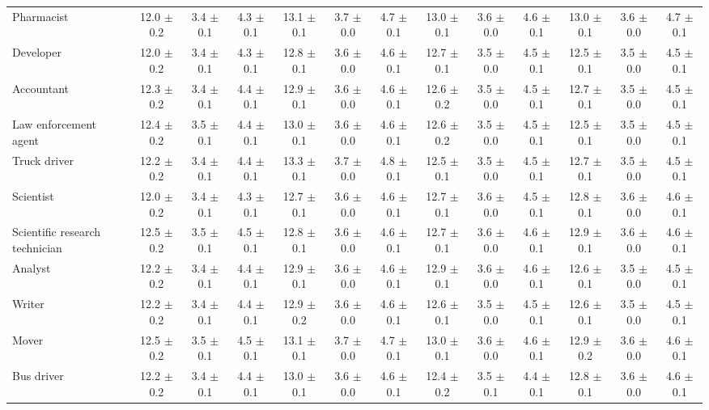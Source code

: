 \begin{table*}[p]
{\begin{tabular}{l|ccc|ccc|ccc|ccc}
Pharmacist
& 12.0 $\pm$ 0.2 & 3.4 $\pm$ 0.1 & 4.3 $\pm$ 0.1 & 13.1 $\pm$ 0.1 & 3.7 $\pm$ 0.0 & 4.7 $\pm$ 0.1 & 13.0 $\pm$ 0.1 & 3.6 $\pm$ 0.0 & 4.6 $\pm$ 0.1 & 13.0 $\pm$ 0.1 & 3.6 $\pm$ 0.0 & 4.7 $\pm$ 0.1 \\
Developer
& 12.0 $\pm$ 0.2 & 3.4 $\pm$ 0.1 & 4.3 $\pm$ 0.1 & 12.8 $\pm$ 0.1 & 3.6 $\pm$ 0.0 & 4.6 $\pm$ 0.1 & 12.7 $\pm$ 0.1 & 3.5 $\pm$ 0.0 & 4.5 $\pm$ 0.1 & 12.5 $\pm$ 0.1 & 3.5 $\pm$ 0.0 & 4.5 $\pm$ 0.1 \\
Accountant
& 12.3 $\pm$ 0.2 & 3.4 $\pm$ 0.1 & 4.4 $\pm$ 0.1 & 12.9 $\pm$ 0.1 & 3.6 $\pm$ 0.0 & 4.6 $\pm$ 0.1 & 12.6 $\pm$ 0.2 & 3.5 $\pm$ 0.0 & 4.5 $\pm$ 0.1 & 12.7 $\pm$ 0.1 & 3.5 $\pm$ 0.0 & 4.5 $\pm$ 0.1 \\
Law enforcement agent
& 12.4 $\pm$ 0.2 & 3.5 $\pm$ 0.1 & 4.4 $\pm$ 0.1 & 13.0 $\pm$ 0.1 & 3.6 $\pm$ 0.0 & 4.6 $\pm$ 0.1 & 12.6 $\pm$ 0.2 & 3.5 $\pm$ 0.0 & 4.5 $\pm$ 0.1 & 12.5 $\pm$ 0.1 & 3.5 $\pm$ 0.0 & 4.5 $\pm$ 0.1 \\
Truck driver
& 12.2 $\pm$ 0.2 & 3.4 $\pm$ 0.1 & 4.4 $\pm$ 0.1 & 13.3 $\pm$ 0.1 & 3.7 $\pm$ 0.0 & 4.8 $\pm$ 0.1 & 12.5 $\pm$ 0.1 & 3.5 $\pm$ 0.0 & 4.5 $\pm$ 0.1 & 12.7 $\pm$ 0.1 & 3.5 $\pm$ 0.0 & 4.5 $\pm$ 0.1 \\
Scientist
& 12.0 $\pm$ 0.2 & 3.4 $\pm$ 0.1 & 4.3 $\pm$ 0.1 & 12.7 $\pm$ 0.1 & 3.6 $\pm$ 0.0 & 4.6 $\pm$ 0.1 & 12.7 $\pm$ 0.1 & 3.6 $\pm$ 0.0 & 4.5 $\pm$ 0.1 & 12.8 $\pm$ 0.1 & 3.6 $\pm$ 0.0 & 4.6 $\pm$ 0.1 \\
Scientific research technician
& 12.5 $\pm$ 0.2 & 3.5 $\pm$ 0.1 & 4.5 $\pm$ 0.1 & 12.8 $\pm$ 0.1 & 3.6 $\pm$ 0.0 & 4.6 $\pm$ 0.1 & 12.7 $\pm$ 0.1 & 3.6 $\pm$ 0.0 & 4.6 $\pm$ 0.1 & 12.9 $\pm$ 0.1 & 3.6 $\pm$ 0.0 & 4.6 $\pm$ 0.1 \\
Analyst
& 12.2 $\pm$ 0.2 & 3.4 $\pm$ 0.1 & 4.4 $\pm$ 0.1 & 12.9 $\pm$ 0.1 & 3.6 $\pm$ 0.0 & 4.6 $\pm$ 0.1 & 12.9 $\pm$ 0.1 & 3.6 $\pm$ 0.0 & 4.6 $\pm$ 0.1 & 12.6 $\pm$ 0.1 & 3.5 $\pm$ 0.0 & 4.5 $\pm$ 0.1 \\
Writer
& 12.2 $\pm$ 0.2 & 3.4 $\pm$ 0.1 & 4.4 $\pm$ 0.1 & 12.9 $\pm$ 0.2 & 3.6 $\pm$ 0.0 & 4.6 $\pm$ 0.1 & 12.6 $\pm$ 0.1 & 3.5 $\pm$ 0.0 & 4.5 $\pm$ 0.1 & 12.6 $\pm$ 0.1 & 3.5 $\pm$ 0.0 & 4.5 $\pm$ 0.1 \\
Mover
& 12.5 $\pm$ 0.2 & 3.5 $\pm$ 0.1 & 4.5 $\pm$ 0.1 & 13.1 $\pm$ 0.1 & 3.7 $\pm$ 0.0 & 4.7 $\pm$ 0.1 & 13.0 $\pm$ 0.1 & 3.6 $\pm$ 0.0 & 4.6 $\pm$ 0.1 & 12.9 $\pm$ 0.2 & 3.6 $\pm$ 0.0 & 4.6 $\pm$ 0.1 \\
Bus driver
& 12.2 $\pm$ 0.2 & 3.4 $\pm$ 0.1 & 4.4 $\pm$ 0.1 & 13.0 $\pm$ 0.1 & 3.6 $\pm$ 0.0 & 4.6 $\pm$ 0.1 & 12.4 $\pm$ 0.2 & 3.5 $\pm$ 0.1 & 4.4 $\pm$ 0.1 & 12.8 $\pm$ 0.1 & 3.6 $\pm$ 0.0 & 4.6 $\pm$ 0.1 \\

\end{tabular}}
\end{table*}
